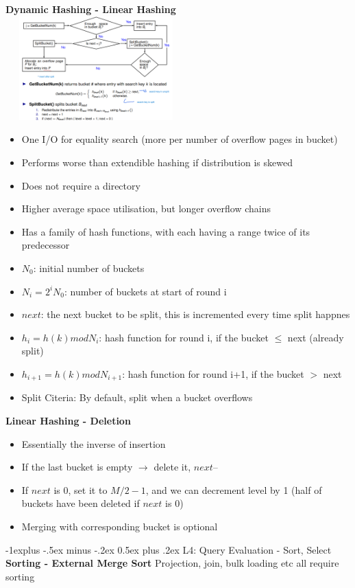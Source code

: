 \documentclass[10pt, landscape]{article}
\makeatletter
\renewcommand{\subsection}{\@startsection{subsection}{2}{0mm}%
                                {-1explus -.5ex minus -.2ex}%
                                {0.5ex plus .2ex}%
                                {\normalfont\normalsize\bfseries}}
\makeatother
\begin{document}
\begin{multicols}{4}
\textbf{Dynamic Hashing - Linear Hashing}
\includegraphics[width=7cm, height=4cm]{linear_hash.png}  
\begin{itemize}
  \item One I/O for equality search (more per number of overflow pages in bucket)
  \item Performs worse than extendible hashing if distribution is skewed
  \item Does not require a directory
  \item Higher average space utilisation, but longer overflow chains
  \item Has a family of hash functions, with each having a range twice of its predecessor
  \item $N_0$: initial number of buckets
  \item $N_i = 2^i N_0$: number of buckets at start of round i
  \item $next$: the next bucket to be split, this is incremented every time split happnes
  \item $h_i=h(k) mod N_{i}$: hash function for round i, if the bucket $\leq$ next (already split)
  \item $h_{i+1}=h(k) mod N_{i+1}$: hash function for round i+1, if the bucket $>$ next
  \item Split Citeria: By default, split when a bucket overflows
\end{itemize}

\textbf{Linear Hashing - Deletion}
\begin{itemize}
  \item Essentially the inverse of insertion
  \item If the last bucket is empty $\rightarrow$ delete it,  $next$--
  \item If $next$ is 0, set it to $M/2 - 1$, and we can decrement level by 1 (half of buckets have been deleted if $next$ is 0)
  \item Merging with corresponding bucket is optional
\end{itemize}

\subsection{L4: Query Evaluation - Sort, Select}
\textbf{Sorting - External Merge Sort}
\newline
Projection, join, bulk loading etc all require sorting


\end{multicols}
\end{document}
